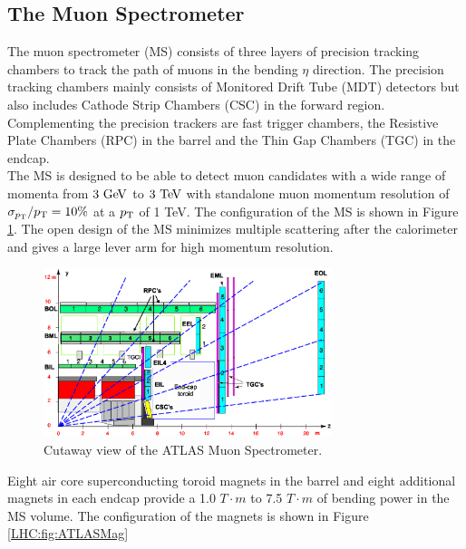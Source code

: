 \subsection{The Muon Spectrometer}
\label{LHC:MuonSpec}

\indent The muon spectrometer (MS) consists of three layers of precision tracking chambers to track the path of muons in the bending $\eta$ direction.  The precision tracking chambers mainly consists of Monitored Drift Tube (MDT) detectors but also includes Cathode Strip Chambers (CSC) in the forward region.  Complementing the precision trackers are fast trigger chambers, the Resistive Plate Chambers (RPC) in the barrel and the Thin Gap Chambers (TGC) in the endcap. \\


\indent The MS is designed to be able to detect muon candidates with a wide range of momenta from $3 \gev$ to $3 \tev$ with standalone muon momentum resolution of $\sigma_{p_{\mathrm{T}}}/p_{\mathrm{T}} = 10\%$ at a $p_{\mathrm{T}}$ of 1 TeV.  The configuration of the MS is shown in Figure \ref{LHC:fig:ATLASMuonSpec}.  The open design of the MS minimizes multiple scattering after the calorimeter and gives a large lever arm for high momentum resolution. ~\\

\begin{figure}[h!]
\centering
\includegraphics[width=0.75\textwidth, angle=0]{figures/LHC_ATLAS/Muon_rz_large_sect_6.eps}
\caption[~Cutaway view of the ATLAS Muon Spectrometer]{ Cutaway view of the ATLAS Muon Spectrometer.\cite{ATLAS_JINST} \label{LHC:fig:ATLASMuonSpec}}
\end{figure}

\indent Eight air core superconducting toroid magnets in the barrel and eight additional magnets in each endcap provide a 1.0 $T \cdot m$ to 7.5 $T \cdot m$ of bending power in the MS volume. The configuration of the magnets is shown in Figure \ref{LHC:fig:ATLASMag} ~\\

